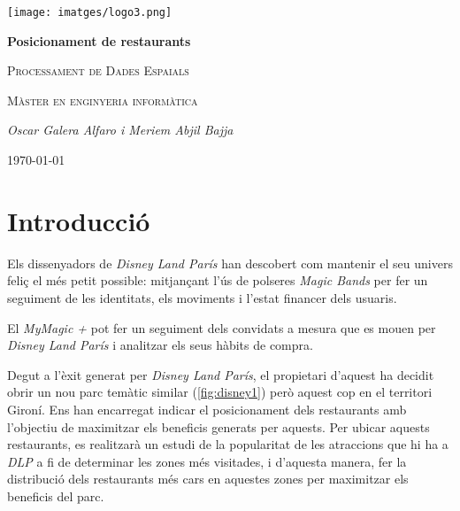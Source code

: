 \documentclass[12pt]{article}
\begin{document}
\begin{titlepage}
		\centering
		\texttt{[image: imatges/logo3.png]}\par\vspace{1cm}
		{\huge\bfseries Posicionament de restaurants\par}
		\vspace{0.3cm}
		{\scshape\Large Processament de Dades Espaials\par}
		\vspace{0.2cm}
		{\scshape\Large Màster en enginyeria informàtica\par}
		\vspace{1.5cm}
		{\Large\itshape Oscar Galera Alfaro i Meriem Abjil Bajja\par}
		\vfill
		{\large \today\par}
\end{titlepage}
\tableofcontents

\clearpage

\listoffigures

\clearpage

\section{Introducció}

Els dissenyadors de \textit{Disney Land París} han descobert com mantenir el seu univers feliç el més petit possible: mitjançant l'ús de polseres \textit{Magic Bands} per fer un seguiment de les identitats, els moviments i l'estat financer dels usuaris.

El \textit{MyMagic +}  pot fer un seguiment dels convidats a mesura que es mouen per \textit{Disney Land París} i analitzar els seus hàbits de compra.

Degut a l'èxit generat per \textit{Disney Land París}, el propietari d'aquest ha decidit obrir un nou parc temàtic similar (\ref{fig:disney1}) però aquest cop en el territori Gironí. Ens han encarregat indicar el posicionament dels restaurants amb l'objectiu de maximitzar els beneficis generats per aquests. Per ubicar aquests restaurants, es realitzarà un estudi de la popularitat de les atraccions que hi ha a \textit{DLP} a fi de determinar les zones més visitades, i d'aquesta manera, fer la distribució dels restaurants més cars en aquestes zones per maximitzar els beneficis del parc.
\end{document}
